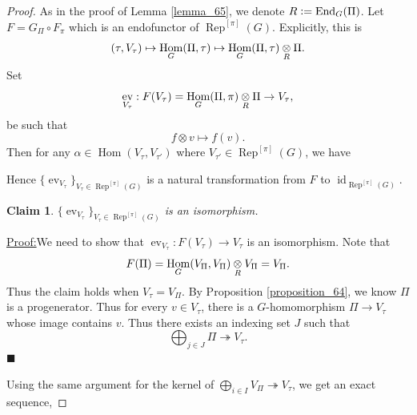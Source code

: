 \documentclass[8pt]{article}
\newtheorem{claim}{Claim}
\newenvironment{claimproof}[1]{\par\noindent\underline{Proof:}\space#1}{\hfill $\blacksquare$}
\DeclareMathOperator{\Rep}{Rep}
\DeclareMathOperator{\Hom}{Hom}
\DeclareMathOperator{\End}{End}
\DeclareMathOperator{\id}{id}
\DeclareMathOperator{\ev}{ev}
\newcommand{\defeq}{\vcentcolon=}
\newcommand{\tens}[1]{%
  \mathbin{\mathop{\otimes}\displaylimits_{#1}}%
}
\begin{document}
\begin{proof}
  As in the proof of Lemma \ref{lemma_65}, we denote $R\defeq\End_G(\Pi)$. Let $F=G_\Pi\circ F_\pi$ which is an endofunctor of $\Rep^{[\pi]}(G)$. Explicitly, this is 
  \begin{equation*}
    (\tau,V_\tau)\mapsto\Hom_G(\Pi,\tau)\mapsto\Hom_G(\Pi,\tau)\tens{R}\Pi.
  \end{equation*}
  Set 
  \begin{equation*}
    \ev_{V_\tau}:F(V_\tau)=\Hom_G(\Pi,\pi)\tens{R}\Pi\to V_\tau,
  \end{equation*}
  be such that 
  \begin{equation*}
    f\otimes v\mapsto f(v).
  \end{equation*}
  Then for any $\alpha\in\Hom(V_\tau,V_{\tau'})$ where $V_{\tau'}\in\Rep^{[\pi]}(G)$, we have 
  \begin{center}
  \end{center}
  Hence $\{\ev_{V_\tau}\}_{V_\tau\in\Rep^{[\pi]}(G)}$ is a natural transformation from $F$ to $\id_{\Rep^{[\pi]}(G)}$.
  \begin{claim}
  $\{\ev_{V_\tau}\}_{V_\tau\in\Rep^{[\pi]}(G)}$ is an isomorphism.
  \end{claim}
  \begin{claimproof}
    We need to show that $\ev_{V_\tau}:F(V_\tau)\to V_\tau$ is an isomorphism. Note that 
    \begin{equation*}
      F(\Pi) = \Hom_G(V_\Pi,V_\Pi)\tens{R}V_\Pi = V_\Pi.
    \end{equation*}
    Thus the claim holds when $V_\tau = V_\Pi$. By Proposition \ref{proposition_64}, we know $\Pi$ is a progenerator. Thus for every $v\in V_\tau$, there is a $G$-homomorphism $\Pi\to V_\tau$ whose image contains $v$. Thus there exists an indexing set $J$ such that 
    \begin{equation*}
      \bigoplus_{j\in J}\Pi\twoheadrightarrow V_\tau.
    \end{equation*}
  \end{claimproof}
  \par Using the same argument for the kernel of $\bigoplus_{i\in I}V_\Pi\twoheadrightarrow V_\tau$, we get an exact sequence,

\end{proof}
\end{document}
